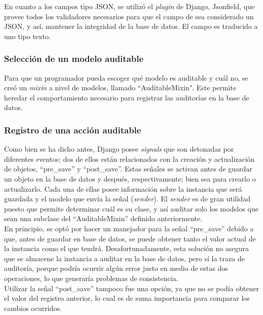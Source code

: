 

En cuanto a los campos tipo JSON, se utilizó el \textit{plugin} de Django, Jsonfield, que provee todos los validadores necesarios para que el campo de sea considerado un JSON, y así, mantener la integridad de la base de datos. El campo es traducido a uno tipo texto.

\subsubsection{Selección de un  modelo auditable}

Para que un programador pueda escoger qué modelo es auditable y cuál no, se creó un \textit{mixin} a nivel de modelos, llamado “AuditableMixin". Este permite heredar el comportamiento necesario para registrar las auditorías en la base de datos.

\subsubsection{Registro de una acción auditable}

Como bien se ha dicho antes, Django posee \textit{signals} que son detonadas por diferentes eventos; dos de ellos están relacionados con la creación y actualización de objetos, “pre\_save” y “post\_save”. Estas señales se activan antes de guardar un objeto en la base de datos y después, respectivamente; bien sea para crearlo o actualizarlo. Cada una de ellas posee información sobre la instancia que será guardada y el modelo que envía la señal (\textit{sender}). El \textit{sender} es de gran utilidad puesto que permite determinar cuál es su clase, y así auditar solo los modelos que sean una subclase del “AuditableMixin” definido anteriormente.\\

En principio, se optó por hacer un manejador para la señal “pre\_save” debido a que, antes de guardar en base de datos, se puede obtener tanto el valor actual de la instancia como el que tendrá. Desafortunadamente, esta solución no asegura que se almacene la instancia a auditar en la base de datos, pero sí la traza de auditoría, porque podría ocurrir algún error justo en medio de estas dos operaciones, lo que generaría problemas de consistencia.\\

Utilizar la señal “post\_save” tampoco fue una opción, ya que no se podía obtener el valor del registro anterior, lo cual es de suma importancia para comparar los cambios ocurridos. \\

